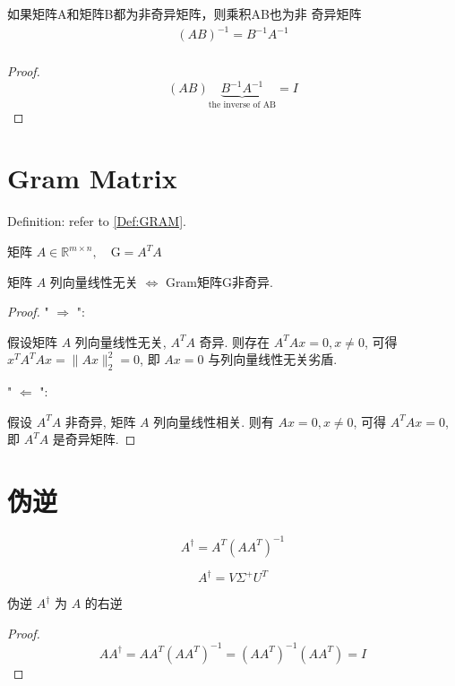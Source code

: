 \begin{corollary}
    如果矩阵A和矩阵B都为非奇异矩阵，则乘积AB也为非 奇异矩阵
$$
\begin{array}{l}
(A B)^{-1}=B^{-1} A^{-1} \\
\end{array}
$$
\end{corollary}

\begin{proof}
    $$(A B) \underbrace{B^{-1} A^{-1}} _{\text{the inverse of AB}}=I$$
\end{proof}

\section{Gram Matrix}

Definition: refer to \ref{Def:GRAM}.

\begin{corollary}
    矩阵 $ A \in \mathbb{R}^{m \times n}, \quad \mathrm{G}=A^{T} A $

矩阵 $ A $ 列向量线性无关 $ \Leftrightarrow $ Gram矩阵G非奇异.
\end{corollary}

\begin{proof}
    " $ \Rightarrow $ ": 
    
    假设矩阵 $ A $ 列向量线性无关, $ A^{T} A $ 奇异.  则存在 $ A^{T} A x=0, x \neq 0 $, 可得 $ x^{T} A^{T} A x=\|A x\|_{2}^{2}=0 $, 即 $ A x=0 $ 与列向量线性无关劣盾.

    " $ \Leftarrow $ ":
    
    假设 $ A^{T} A $ 非奇异, 矩阵 $ A $ 列向量线性相关.  则有 $ A x=0, x \neq 0 $, 可得 $ A^{T} A x=0 $, 即 $ A^{T} A $ 是奇异矩阵. 
\end{proof}

\section{伪逆}

\begin{definition}
    $$ A^{\dagger}=A^{T}\left(A A^{T}\right)^{-1} $$

    $$A^{\dagger} = V \Sigma^+ U^T$$
\end{definition}

\begin{theorem}
    伪逆 $ A^{\dagger} $ 为 $ A $ 的右逆
\end{theorem}

\begin{proof}
    $$ A A^{\dagger}=A A^{T}\left(A A^{T}\right)^{-1}=\left(A A^{T}\right)^{-1}\left(A A^{T}\right)=I $$
\end{proof}

